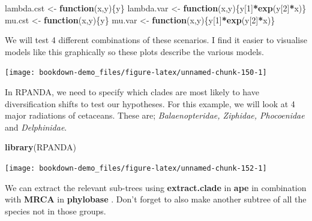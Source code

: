 \documentclass[
]{book}
\newenvironment{Shaded}{\begin{snugshade}}{\end{snugshade}}
\newcommand{\ControlFlowTok}[1]{\textcolor[rgb]{0.13,0.29,0.53}{\textbf{#1}}}
\newcommand{\DecValTok}[1]{\textcolor[rgb]{0.00,0.00,0.81}{#1}}
\newcommand{\KeywordTok}[1]{\textcolor[rgb]{0.13,0.29,0.53}{\textbf{#1}}}
\newcommand{\NormalTok}[1]{#1}
\newcommand{\OperatorTok}[1]{\textcolor[rgb]{0.81,0.36,0.00}{\textbf{#1}}}
\newcommand{\StringTok}[1]{\textcolor[rgb]{0.31,0.60,0.02}{#1}}
\begin{document}
\begin{Shaded}
\begin{Highlighting}[]
\NormalTok{lambda.cst \textless{}{-}}\StringTok{ }\ControlFlowTok{function}\NormalTok{(x,y)\{y\}}
\NormalTok{lambda.var \textless{}{-}}\StringTok{ }\ControlFlowTok{function}\NormalTok{(x,y)\{y[}\DecValTok{1}\NormalTok{]}\OperatorTok{*}\KeywordTok{exp}\NormalTok{(y[}\DecValTok{2}\NormalTok{]}\OperatorTok{*}\NormalTok{x)\}}
\NormalTok{mu.cst \textless{}{-}}\StringTok{ }\ControlFlowTok{function}\NormalTok{(x,y)\{y\}}
\NormalTok{mu.var \textless{}{-}}\StringTok{ }\ControlFlowTok{function}\NormalTok{(x,y)\{y[}\DecValTok{1}\NormalTok{]}\OperatorTok{*}\KeywordTok{exp}\NormalTok{(y[}\DecValTok{2}\NormalTok{]}\OperatorTok{*}\NormalTok{x)\}}
\end{Highlighting}
\end{Shaded}

We will test 4 different combinations of these scenarios. I find it easier to visualise models like this graphically so these plots describe the various models.

\begin{center}\texttt{[image: bookdown-demo\_files/figure-latex/unnamed-chunk-150-1]} \end{center}

In RPANDA, we need to specify which clades are most likely to have diversification shifts to test our hypotheses. For this example, we will look at 4 major radiations of cetaceans. These are; \emph{Balaenopteridae, Ziphidae, Phocoenidae} and \emph{Delphinidae}.

\begin{Shaded}
\begin{Highlighting}[]
\KeywordTok{library}\NormalTok{(RPANDA)}
\end{Highlighting}
\end{Shaded}

\begin{center}\texttt{[image: bookdown-demo\_files/figure-latex/unnamed-chunk-152-1]} \end{center}

We can extract the relevant sub-trees using \textbf{extract.clade} in \textbf{ape} \citep{ape} in combination with \textbf{MRCA} in \textbf{phylobase} \citep{phylobase}. Don't forget to also make another subtree of all the species not in those groups.
\end{document}
